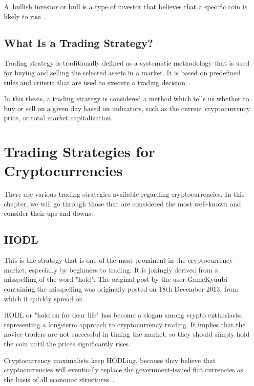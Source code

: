 A~bullish investor or bull is a type of investor that believes that a specific coin is likely to rise~\cite{investopedia-bull}.

\section{What Is a Trading Strategy?}
Trading strategy is traditionally defined as a systematic methodology that is used for buying and selling the selected assets in a market. It is based on predefined rules and criteria that are used to execute a trading decision~\cite{investopedia:trading-strategy}.

In this thesis, a trading strategy is considered a method which tells us whether to buy or sell on a given day based on indicators, such as the current cryptocurrency price, or total market capitalization.

\chapter{Trading Strategies for Cryptocurrencies}
\label{chapter-trading-stategies}

There are various trading strategies available regarding cryptocurrencies.
In this chapter, we will go through those that are considered the most well-known and consider
their ups and downs.

\section{HODL}

This is the strategy that is one of the most prominent in the cryptocurrency market, especially by beginners to trading.
It is jokingly derived from a misspelling of the word "hold". The original post by the user GameKyuubi~\cite{hodl-post} containing the misspelling was originally posted on 18th December 2013, from which it quickly spread on.

HODL or "hold on for dear life" has become a slogan among crypto enthusiasts, representing a long-term approach to cryptocurrency trading. It implies that the novice traders are not successful in timing the market, so they should simply hold the coin until the prices significantly rises.

Cryptocurrency maximalists keep HODLing, because they believe that cryptocurrencies will eventually replace the government-issued fiat currencies as the basis of all economic structures~\cite{investopedia-hodl}.

